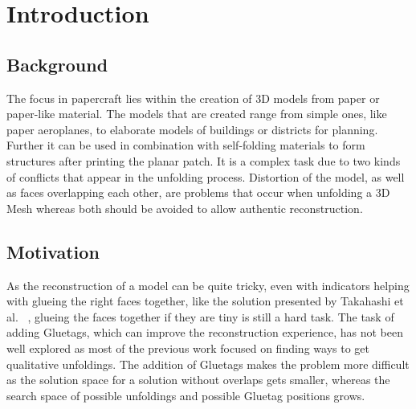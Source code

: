 \documentclass[draft,final]{vutinfth} %
\begin{document}

\tableofcontents %

\mainmatter

\chapter{Introduction}

\section{Background}
The focus in papercraft lies within the creation of 3D models from paper or paper-like material. The models that are created range from simple ones, like paper aeroplanes, to elaborate models of buildings or districts for planning. Further it can be used in combination with self-folding materials to form structures after printing the planar patch. It is a complex task due to two kinds of conflicts that appear in the unfolding process. Distortion of the model, as well as faces overlapping each other, are problems that occur when unfolding a 3D Mesh whereas both should be avoided to allow authentic reconstruction.

\section{Motivation}
As the reconstruction of a model can be quite tricky, even with indicators helping with glueing the right faces together, like the solution presented by Takahashi et al.
~\cite{takahashi2011optimized}, glueing the faces together if they are tiny is still a hard task.
The task of adding Gluetags, which can improve the reconstruction experience, has not been well explored as most of the previous work focused on finding ways to get qualitative unfoldings. The addition of Gluetags makes the problem more difficult as the solution space for a solution without overlaps gets smaller, whereas the search space of possible unfoldings and possible Gluetag positions grows.
\end{document}
